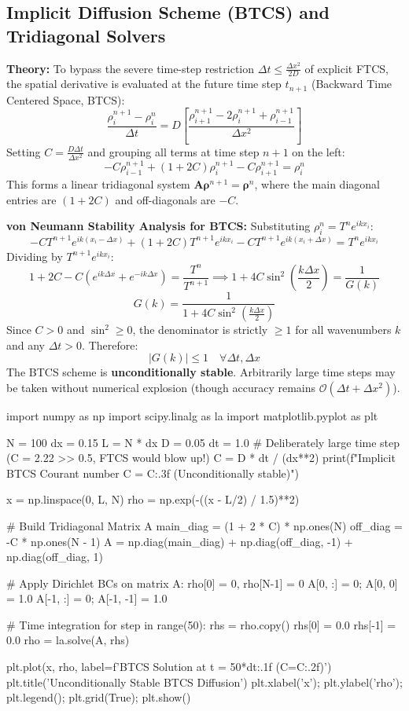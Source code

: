 \documentclass{article}
\begin{document}
\subsection{Implicit Diffusion Scheme (BTCS) and Tridiagonal Solvers}
\textbf{Theory:} To bypass the severe time-step restriction $\Delta t \le \frac{\Delta x^2}{2D}$ of explicit FTCS, the spatial derivative is evaluated at the future time step $t_{n+1}$ (Backward Time Centered Space, BTCS):
$$\frac{\rho_i^{n+1} - \rho_i^n}{\Delta t} = D \left[ \frac{\rho_{i+1}^{n+1} - 2\rho_i^{n+1} + \rho_{i-1}^{n+1}}{\Delta x^2} \right]$$
Setting $C = \frac{D \Delta t}{\Delta x^2}$ and grouping all terms at time step $n+1$ on the left:
$$-C \rho_{i-1}^{n+1} + (1 + 2C) \rho_i^{n+1} - C \rho_{i+1}^{n+1} = \rho_i^n$$
This forms a linear tridiagonal system $\mathbf{A} \boldsymbol{\rho}^{n+1} = \boldsymbol{\rho}^n$, where the main diagonal entries are $(1 + 2C)$ and off-diagonals are $-C$.

\textbf{von Neumann Stability Analysis for BTCS:}
Substituting $\rho_i^n = T^n e^{i k x_i}$:
$$-C T^{n+1} e^{i k(x_i - \Delta x)} + (1 + 2C) T^{n+1} e^{i k x_i} - C T^{n+1} e^{i k(x_i + \Delta x)} = T^n e^{i k x_i}$$
Dividing by $T^{n+1} e^{i k x_i}$:
$$1 + 2C - C(e^{i k \Delta x} + e^{-i k \Delta x}) = \frac{T^n}{T^{n+1}} \implies 1 + 4C \sin^2\left(\frac{k \Delta x}{2}\right) = \frac{1}{G(k)}$$
$$G(k) = \frac{1}{1 + 4C \sin^2\left(\frac{k \Delta x}{2}\right)}$$
Since $C > 0$ and $\sin^2 \ge 0$, the denominator is strictly $\ge 1$ for all wavenumbers $k$ and any $\Delta t > 0$. Therefore:
$$|G(k)| \le 1 \quad \forall \Delta t, \Delta x$$
The BTCS scheme is \textbf{unconditionally stable}. Arbitrarily large time steps may be taken without numerical explosion (though accuracy remains $\mathcal{O}(\Delta t + \Delta x^2)$).

\begin{jupytercode}
import numpy as np
import scipy.linalg as la
import matplotlib.pyplot as plt

N = 100
dx = 0.15
L = N * dx
D = 0.05
dt = 1.0              # Deliberately large time step (C = 2.22 >> 0.5, FTCS would blow up!)
C = D * dt / (dx**2)
print(f"Implicit BTCS Courant number C = {C:.3f} (Unconditionally stable)")

x = np.linspace(0, L, N)
rho = np.exp(-((x - L/2) / 1.5)**2)

# Build Tridiagonal Matrix A
main_diag = (1 + 2 * C) * np.ones(N)
off_diag = -C * np.ones(N - 1)
A = np.diag(main_diag) + np.diag(off_diag, -1) + np.diag(off_diag, 1)

# Apply Dirichlet BCs on matrix A: rho[0] = 0, rho[N-1] = 0
A[0, :] = 0; A[0, 0] = 1.0
A[-1, :] = 0; A[-1, -1] = 1.0

# Time integration
for step in range(50):
    rhs = rho.copy()
    rhs[0] = 0.0
    rhs[-1] = 0.0
    rho = la.solve(A, rhs)

plt.plot(x, rho, label=f'BTCS Solution at t = {50*dt:.1f} (C={C:.2f})')
plt.title('Unconditionally Stable BTCS Diffusion')
plt.xlabel('x'); plt.ylabel('rho'); plt.legend(); plt.grid(True); plt.show()
\end{jupytercode}
\newpage
\end{document}
